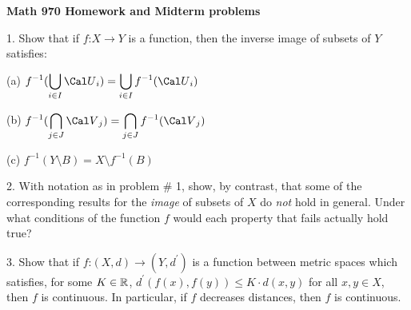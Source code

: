 


\def\u{\underbar}
\def\ctln{\centerline}
\def\ni{\noindent}
\def\ssk{\smallskip}
\def\msk{\medskip}
\def\bsk{\bigskip}
\def\ra{\rightarrow}
\def\itt{\item}
\def\pr{\hskip-10pt}
\def\hsk{\hskip10pt}
\def\hhsk{\hskip20pt}
\def\lra{$\Leftrightarrow\ $ }
\def\exs{$\exists\ $}
\def\foa{$\forall\ $}
\def\cau{{\Cal U} }
\def\cav{{\Cal V}}
\def\sset{\subseteq}
\def\finv{f^{-1}}
\def\catm{${\Cal T}\ $}
\def\cat{{\Cal T}}
\def\catpm{$\cat^\prime\ $}
\def\catp{\cat^\prime}
\def\top{topology}
\def\tops{topologies}
\def\cts{continuous}
\def\smin{\setminus}
\def\cab{{\Cal B}}
\def\cabm{${\Cal B}\ $}
\def\cas{{\Cal S}}
\def\casm{${\Cal S}\ $}
\def\bbbr{{\Bbb R}}
\def\bbbn{{\Bbb N}}
\def\bbbq{{\Bbb Q}}

\UseAMSsymbols

\ctln{\bf Math 970 Homework and Midterm problems}

\msk

\item{1.} Show that if $f$:$X\rightarrow Y$ is a function, then the inverse
image of subsets of $Y$ satisfies:

\ssk

\item{(a)} $\displaystyle f^{-1}(\bigcup_{i\in I} {\Cal U}_i) =\bigcup_{i\in I} f^{-1}({\Cal U}_i)$

\ssk

\item{(b)} $\displaystyle f^{-1}(\bigcap_{j\in J} {\Cal V}_j) =\bigcap_{j\in J} f^{-1}({\Cal V}_j)$

\ssk

\item{(c)} $\displaystyle f^{-1}(Y\setminus B) = X\setminus f^{-1}(B)$

\ssk

\item{2.} With notation as in problem \# 1, show, by contrast, that some 
of the corresponding results for the {\it image} of subsets of $X$ do {\it not}
hold in general. Under what conditions of the function $f$ would each 
property that fails actually hold true?

\ssk

\item{3.} Show that if $f$:$(X,d)\rightarrow (Y,d^\prime)$ is a function between
metric spaces which satisfies, for some $K\in{\Bbb R}$, 
$d^\prime(f(x),f(y))\leq K\cdot d(x,y)$ for all $x,y\in X$, then $f$ is continuous. In particular, if
$f$ decreases distances, then $f$ is continuous.

